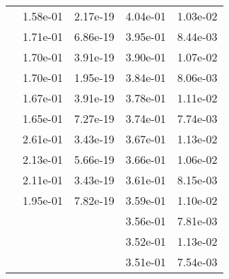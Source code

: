 \begin{table}
\begin{tabular}{c|cc|cc|}
\multicolumn{1}{|c|}{} & \multicolumn{1}{|c|}{  1.58e-01} & \multicolumn{1}{|c|}{  2.17e-19} & \multicolumn{1}{|c|}{  4.04e-01} & \multicolumn{1}{|c|}{  1.03e-02} \\ 
\multicolumn{1}{|c|}{} & \multicolumn{1}{|c|}{  1.71e-01} & \multicolumn{1}{|c|}{  6.86e-19} & \multicolumn{1}{|c|}{  3.95e-01} & \multicolumn{1}{|c|}{  8.44e-03} \\ 
\multicolumn{1}{|c|}{} & \multicolumn{1}{|c|}{  1.70e-01} & \multicolumn{1}{|c|}{  3.91e-19} & \multicolumn{1}{|c|}{  3.90e-01} & \multicolumn{1}{|c|}{  1.07e-02} \\ 
\multicolumn{1}{|c|}{} & \multicolumn{1}{|c|}{  1.70e-01} & \multicolumn{1}{|c|}{  1.95e-19} & \multicolumn{1}{|c|}{  3.84e-01} & \multicolumn{1}{|c|}{  8.06e-03} \\ 
\multicolumn{1}{|c|}{} & \multicolumn{1}{|c|}{  1.67e-01} & \multicolumn{1}{|c|}{  3.91e-19} & \multicolumn{1}{|c|}{  3.78e-01} & \multicolumn{1}{|c|}{  1.11e-02} \\ 
\multicolumn{1}{|c|}{} & \multicolumn{1}{|c|}{  1.65e-01} & \multicolumn{1}{|c|}{  7.27e-19} & \multicolumn{1}{|c|}{  3.74e-01} & \multicolumn{1}{|c|}{  7.74e-03} \\ 
\multicolumn{1}{|c|}{} & \multicolumn{1}{|c|}{  2.61e-01} & \multicolumn{1}{|c|}{  3.43e-19} & \multicolumn{1}{|c|}{  3.67e-01} & \multicolumn{1}{|c|}{  1.13e-02} \\ 
\multicolumn{1}{|c|}{} & \multicolumn{1}{|c|}{  2.13e-01} & \multicolumn{1}{|c|}{  5.66e-19} & \multicolumn{1}{|c|}{  3.66e-01} & \multicolumn{1}{|c|}{  1.06e-02} \\ 
\multicolumn{1}{|c|}{} & \multicolumn{1}{|c|}{  2.11e-01} & \multicolumn{1}{|c|}{  3.43e-19} & \multicolumn{1}{|c|}{  3.61e-01} & \multicolumn{1}{|c|}{  8.15e-03} \\ 
\multicolumn{1}{|c|}{} & \multicolumn{1}{|c|}{  1.95e-01} & \multicolumn{1}{|c|}{  7.82e-19} & \multicolumn{1}{|c|}{  3.59e-01} & \multicolumn{1}{|c|}{  1.10e-02} \\ 
\multicolumn{1}{|c|}{} & \multicolumn{1}{|c|}{} & \multicolumn{1}{|c|}{} & \multicolumn{1}{|c|}{  3.56e-01} & \multicolumn{1}{|c|}{  7.81e-03} \\ 
\multicolumn{1}{|c|}{} & \multicolumn{1}{|c|}{} & \multicolumn{1}{|c|}{} & \multicolumn{1}{|c|}{  3.52e-01} & \multicolumn{1}{|c|}{  1.13e-02} \\ 
\multicolumn{1}{|c|}{} & \multicolumn{1}{|c|}{} & \multicolumn{1}{|c|}{} & \multicolumn{1}{|c|}{  3.51e-01} & \multicolumn{1}{|c|}{  7.54e-03} \\ 

\end{tabular}
\end{table}
